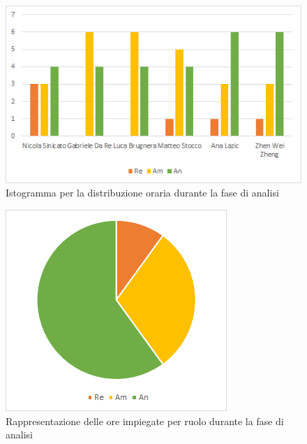 \begin{figure}[H]
    \centering
    \includegraphics[scale=0.6]{img/grafi preventivo/istogrammi/analisi/periodo1.png}
    \caption{Istogramma per la distribuzione oraria durante la fase di analisi}
\end{figure}
\begin{figure}[H]
    \centering
    \includegraphics[scale=0.6]{img/grafi preventivo/torta/analisi/periodo1.png}
    \caption{Rappresentazione delle ore impiegate per ruolo durante la fase di analisi}
\end{figure}
%
